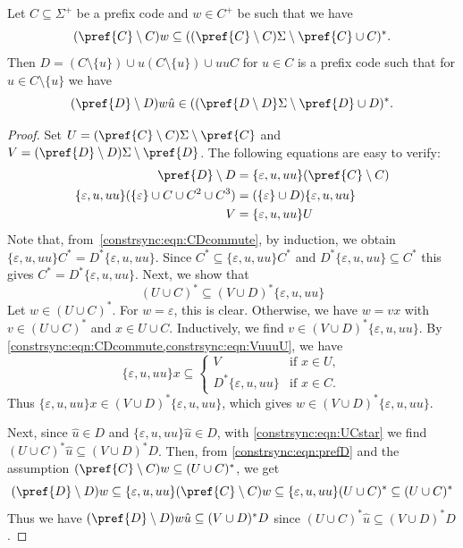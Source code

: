 \begin{lemma} \label{constrsync:lem:aux-state-new-code}
	Let $C \subseteq \Sigma^+$ be a prefix code
	and $w \in C^+$
	be such that we have
	\[
	( \pref{C} \setminus C) w \subseteq ( (\pref{C}\setminus C)\Sigma \setminus \pref{C} \cup C)^*.
	\]
	Then $D = ( C \setminus \{u\} ) \cup u(C \setminus \{u\}) \cup uuC$
	for $u \in C$ is a prefix code 
	such that for $\hat{u} \in C \setminus \{u\}$ we have
	\[
	( \pref{D} \setminus D ) w \hat{u} \in ( (\pref{D\setminus D}\Sigma \setminus \pref{D} \cup D)^*.
	\]
\end{lemma}
\begin{proof} 
	Set $U = (\pref{C}\setminus C)\Sigma \setminus \pref{C}$
	and $V = (\pref{D}\setminus D)\Sigma \setminus \pref{D}$.
	The following equations are easy to verify:
	\begin{align}
		\pref{D} \setminus D & = \{\varepsilon, u, uu\} ( \pref{C} \setminus C )  \label{constrsync:eqn:prefD} \\
		\{\varepsilon, u, uu\}(\{\varepsilon\} \cup C \cup C^2 \cup C^3)& = (\{\varepsilon\} \cup D)\{\varepsilon, u, uu\} \label{constrsync:eqn:CDcommute} \\
		V & = \{\varepsilon,u,uu\} U \label{constrsync:eqn:VuuuU}
	\end{align}
	Note that, from~\cref{constrsync:eqn:CDcommute}, 
	by induction, we obtain
	$
		\{\varepsilon, u, uu\}C^* = D^*\{\varepsilon, u, uu\}.
	$
	Since $C^* \subseteq \{\varepsilon, u, uu\} C^*$
	and $ D^*\{\varepsilon, u, uu\} \subseteq C^*$
	this gives $C^* = D^*\{\varepsilon, u, uu\}$.	
	Next, we show that
	\begin{equation} \label{constrsync:eqn:UCstar} 
	(U \cup C)^* \subseteq (V \cup D)^*\{\varepsilon, u, uu\}
	\end{equation}
	Let $w \in (U \cup C)^*$.
	For $w = \varepsilon$, this is clear.
	Otherwise, we have $w = v x$ with $v \in (U \cup C)^*$
	and $x \in U \cup C$.
	Inductively, we find $v \in (V \cup D)^* \{\varepsilon, u, uu\}$.
	By \cref{constrsync:eqn:CDcommute,constrsync:eqn:VuuuU}, we have
	\[
	\{\varepsilon, u, uu\} x \subseteq
	\begin{cases}
		V     & \text{if } x \in U, \\
		D^* \{\varepsilon, u, uu\} & \text{if } x \in C. 
	\end{cases} 
	\]
	Thus $\{\varepsilon, u, uu\} x \in (V \cup D)^* \{\varepsilon, u, uu\}$,
	which gives $w \in (V \cup D)^* \{\varepsilon, u, uu\}$.
	
	Next, since $\hat{u} \in D$ and $\{\varepsilon, u, uu\}\hat{u} \in D$,
	with \cref{constrsync:eqn:UCstar} we find 
	$(U \cup C)^* \hat{u} \subseteq (V \cup D)^* D$.
	Then, from \cref{constrsync:eqn:prefD} and the assumption
	$(\pref{C}\setminus C)w \subseteq (U \cup C)^*$, we get
	\[
	(\pref{D}\setminus D)w \subseteq \{\varepsilon,u,uu\}(\pref{C} \setminus C) w \subseteq \{\varepsilon, u, uu \} ( U \cup C )^*
	\subseteq ( U \cup C )^*
	\]
	Thus we have $(\pref{D}\setminus D)w\hat{u} \subseteq (V\cup D)^*D$
	since $(U \cup C)^* \hat{u} \subseteq (V \cup D)^* D$.
\end{proof}
	
